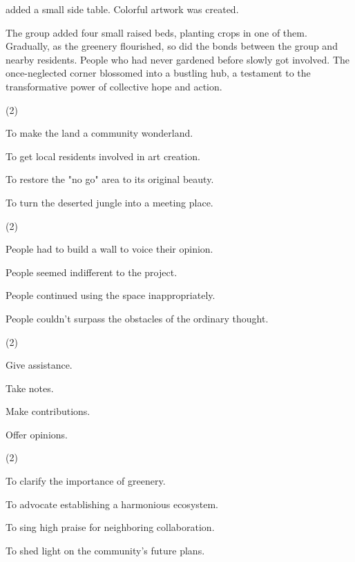 \documentclass{英语试卷}
\begin{document}
\par added a small side table. Colorful artwork was created.\par
\par The group added four small raised beds, planting crops in one of them. Gradually, as the greenery flourished, so did the bonds between the group and nearby residents. People who had never gardened before slowly got involved. The once-neglected corner blossomed into a bustling hub, a testament to the transformative power of collective hope and action.\par
{}
\begin{choices}(2)
  \item To make the land a community wonderland.
  \item To get local residents involved in art creation.
  \item To restore the "no go" area to its original beauty.
  \item To turn the deserted jungle into a meeting place.
\end{choices}
\begin{choices}(2)
  \item People had to build a wall to voice their opinion.
  \item People seemed indifferent to the project.
  \item People continued using the space inappropriately.
  \item People couldn't surpass the obstacles of the ordinary thought.
\end{choices}
\begin{choices}(2)
  \item Give assistance.
  \item Take notes.
  \item Make contributions.
  \item Offer opinions.
\end{choices}
\begin{choices}(2)
  \item To clarify the importance of greenery.
  \item To advocate establishing a harmonious ecosystem.
  \item To sing high praise for neighboring collaboration.
  \item To shed light on the community's future plans.
\end{choices}
\end{document}

